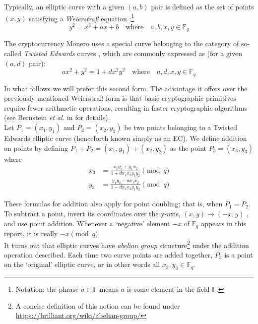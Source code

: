 Typically, an elliptic curve with a given $(a,b)$ pair is defined as the set of points \((x, y)\) satisfying a {\em Weierstraß} equation \cite{Hankerson:2003:GEC:940321}:\footnote{\label{notation1}Notation: the phrase $a \in \mathbb{F}$ means $a$ is some element in the field $\mathbb{F}$.}\vspace{.2cm}
\[y^2 = x^3 + a x + b \quad \textrm{where} \quad a, b, x, y \in \mathbb{F}_q \]

The cryptocurrency Monero uses a special curve belonging to the category of so-called {\em Twisted Edwards} curves \cite{Bernstein2008}, which are commonly expressed as (for a given $(a,d)$ pair):\vspace{.2cm}
\[a x^2 + y^2 = 1 + d x^2 y^2 \quad \textrm{where} \quad a, d, x, y \in \mathbb{F}_q \]


In what follows we will prefer this second form. The advantage it offers over the previously mentioned Weierstraß form is that basic cryptographic primitives require fewer arithmetic operations, resulting in faster cryptographic algorithms (see Bernstein {\em et al.} in \cite{Bernstein2007} for details).\\

Let \(P_1 = (x_1, y_1)\) and \(P_2 = (x_2, y_2)\) be two points belonging to a Twisted Edwards elliptic curve (henceforth known simply as an EC). We define addition on points by defining $P_1 + P_2 = (x_1, y_1) + (x_2, y_2)$ as the point $P_3 = (x_3, y_3)$ where\\
\begin{align*}
x_3 & =  \frac{x_1 y_2 + y_1 x_ 2}{1 + d x_1 x_2 y_1 y_2}  \pmod{q} \\
y_3 & =  \frac{y_1 y_2 - a x_1 x_2}{1 - d x_1 x_2 y_1 y_2} \pmod{q} 
\end{align*}

These formulas for addition also apply for point doubling; that is, when  \(P_1 = P_2\). To subtract a point, invert its coordinates over the y-axis, $(x,y) \rightarrow (-x,y)$ \cite{Bernstein2008}, and use point addition. Whenever a `negative' element $-x$ of $\mathbb{F}_q$ appears in this report, it is really $-x \pmod{q}$.
\\

It turns out that elliptic curves have {\em abelian group} structure\footnote{\label{abelian_note}A concise definition of this notion can be found under \url{https://brilliant.org/wiki/abelian-group/}} under the addition operation described. Each time two curve points are added together, $P_3$ is a point on the `original' elliptic curve, or in other words all $x_3,y_3 \in \mathbb{F}_q$.

